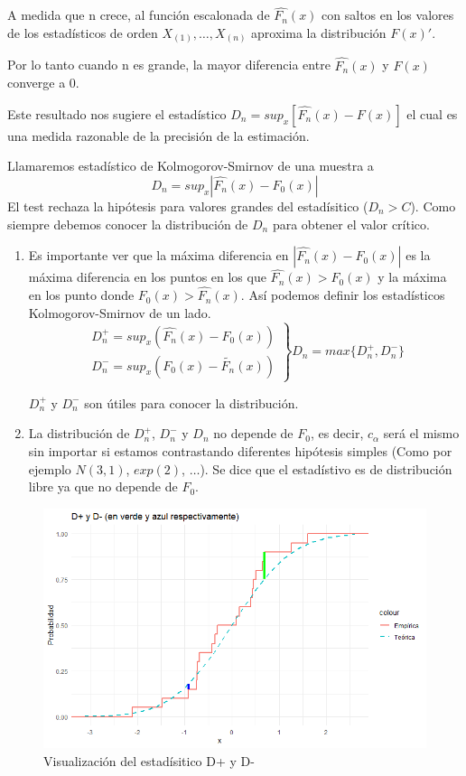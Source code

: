 A medida que n crece, al función escalonada de $\widehat{F_n}(x)$ con saltos en los valores de los estadísticos de orden $X_{(1)},\dots,X_{(n)}$ aproxima la distribución $F(x)'$.  %

Por lo tanto cuando n es grande, la mayor diferencia entre $\widehat{F_n}(x)$ y $F(x)$ converge a 0.

Este resultado nos sugiere el estadístico $D_n=sup_x[\widehat{F_n}(x)-F(x)]$ el cual es una medida razonable de la precisión de la estimación.

Llamaremos estadístico de Kolmogorov-Smirnov de una muestra a
\[
    D_n=sup_x|\widehat{F_n}(x)-F_0(x)|
\]
El test rechaza la hipótesis para valores grandes del estadísitico ($D_n>C$).
Como siempre debemos conocer la distribución de $D_n$ para obtener el valor crítico.

\begin{enumerate}
    \item Es importante ver que la máxima diferencia en $|\widehat{F_n}(x)-F_0(x)|$ es la máxima 
    diferencia en los puntos en los que $\widehat{F_n}(x)>F_0(x)$ y la máxima en los punto donde $F_0(x)>\widehat{F_n}(x)$. 
    Así podemos definir los estadísticos Kolmogorov-Smirnov de un lado.
    \[
        \left.\begin{matrix}
                D_n^+=sup_x(\widehat{F_n}(x)-F_0(x)) \\
                D_n^-=sup_x(F_0(x)-\widetilde{F_n}(x))
        \end{matrix}\right\}
        D_n=max\{D_n^+,D_n^-\}
    \]
            
    $D_n^+$ y $D_n^-$ son útiles para conocer la distribución.

    \item La distribución de $D_n^+$, $D_n^-$ y $D_n$ no depende de $F_0$, es decir, $c_\alpha$ será el mismo sin importar si estamos contrastando diferentes hipótesis simples (Como por ejemplo $N(3,1)$, $exp(2)$, $\dots$). Se dice que el estadístivo es de distribución libre ya que no depende de $F_0$.
\end{enumerate}

\begin{figure}[h!]
    \centering
    \includegraphics[width=\textwidth]{assets/Tema4/EjemploD.png}
    \caption{Visualización del estadísitico D+ y D-}
    \label{fig:Dplus_Dminus}
\end{figure}

